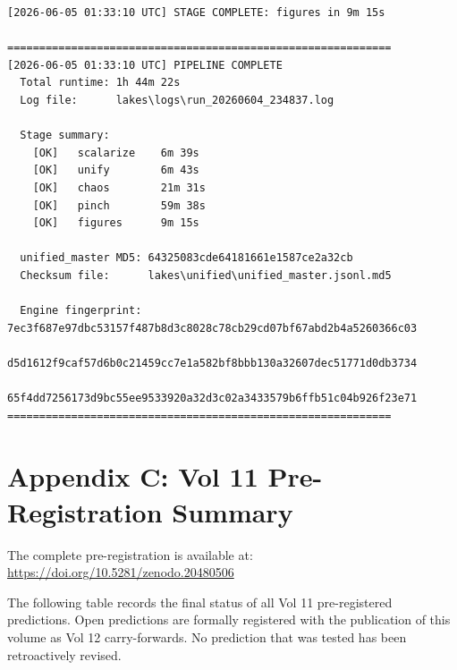 \documentclass[11pt, letterpaper, openany]{book}
\begin{document}
\begin{empiricalbox}
\begin{lstlisting}[style=terminal]
[2026-06-05 01:33:10 UTC] STAGE COMPLETE: figures in 9m 15s

============================================================
[2026-06-05 01:33:10 UTC] PIPELINE COMPLETE
  Total runtime: 1h 44m 22s
  Log file:      lakes\logs\run_20260604_234837.log

  Stage summary:
    [OK]   scalarize    6m 39s
    [OK]   unify        6m 43s
    [OK]   chaos        21m 31s
    [OK]   pinch        59m 38s
    [OK]   figures      9m 15s

  unified_master MD5: 64325083cde64181661e1587ce2a32cb
  Checksum file:      lakes\unified\unified_master.jsonl.md5

  Engine fingerprint: 7ec3f687e97dbc53157f487b8d3c8028c78cb29cd07bf67abd2b4a5260366c03
                      d5d1612f9caf57d6b0c21459cc7e1a582bf8bbb130a32607dec51771d0db3734
                      65f4dd7256173d9bc55ee9533920a32d3c02a3433579b6ffb51c04b926f23e71
============================================================

\end{lstlisting}
\clearpage

\chapter*{Appendix C: Vol 11 Pre-Registration Summary}

The complete pre-registration is available at:
\url{https://doi.org/10.5281/zenodo.20480506}

The following table records the final status of all Vol 11 pre-registered
predictions. Open predictions are formally registered with the publication
of this volume as Vol 12 carry-forwards. No prediction that was tested has
been retroactively revised.


\end{empiricalbox}
\end{document}
